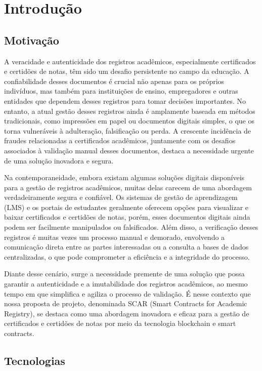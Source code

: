 \documentclass[10pt]{article}
\begin{document}
\section{Introdução}

\subsection*{Motivação}

A veracidade e autenticidade dos registros acadêmicos, especialmente certificados e certidões de notas,
têm sido um desafio persistente no campo da educação. A confiabilidade desses documentos é crucial não apenas
para os próprios indivíduos, mas também para instituições de ensino, empregadores e outras entidades que
dependem desses registros para tomar decisões importantes. No entanto, a atual gestão desses registros
ainda é amplamente baseada em métodos tradicionais, como impressões em papel ou documentos digitais simples,
o que os torna vulneráveis à adulteração, falsificação ou perda. A crescente incidência de fraudes
relacionadas a certificados acadêmicos, juntamente com os desafios associados à validação manual desses
documentos, destaca a necessidade urgente de uma solução inovadora e segura.

Na contemporaneidade, embora existam algumas soluções digitais disponíveis para a gestão de registros acadêmicos,
muitas delas carecem de uma abordagem verdadeiramente segura e confiável. Os sistemas de gestão de aprendizagem
(LMS) e os portais de estudantes geralmente oferecem opções para visualizar e baixar certificados e certidões
de notas, porém, esses documentos digitais ainda podem ser facilmente manipulados ou falsificados. Além disso,
a verificação desses registros é muitas vezes um processo manual e demorado, envolvendo a comunicação direta entre
as partes interessadas ou a consulta a bases de dados centralizadas, o que pode comprometer a eficiência
e a integridade do processo.

Diante desse cenário, surge a necessidade premente de uma solução que possa garantir a autenticidade e a
imutabilidade dos registros acadêmicos, ao mesmo tempo em que simplifica e agiliza o processo de validação.
É nesse contexto que nossa proposta de projeto, denominada SCAR (Smart Contracts for Academic Registry),
se destaca como uma abordagem inovadora e eficaz para a gestão de certificados e certidões de notas por
meio da tecnologia blockchain e smart contracts.

\subsection*{Tecnologias}
\end{document}
